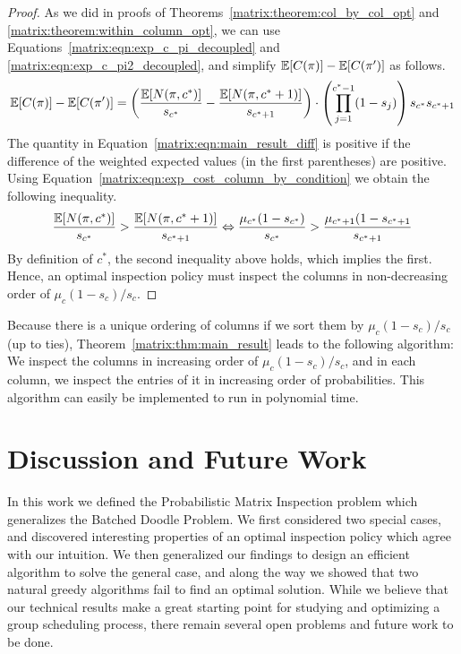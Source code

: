 \begin{proof}
 	As we did in proofs of Theorems~\ref{matrix:theorem:col_by_col_opt} and \ref{matrix:theorem:within_column_opt}, we can use Equations~\ref{matrix:eqn:exp_c_pi_decoupled} and \ref{matrix:eqn:exp_c_pi2_decoupled}, and simplify $\mathbb{E}[C(\pi)] - \mathbb{E}[C(\pi')]$ as follows.
	\small
 	\begin{equation} \label{matrix:eqn:main_result_diff}
 		\mathbb{E}[C(\pi)] - \mathbb{E}[C(\pi')] =  \left(\frac{\mathbb{E}[N(\pi, c^*)]}{s_{c^*}}  - \frac{\mathbb{E}[N(\pi, c^*+1)]}{s_{c^*+1}} \right)  \cdot \left( \prod_{j=1}^{c^*-1} (1 - s_j)\right) s_{c^*} s_{c^*+1}
 	\end{equation}	
	\normalsize
 	The quantity in Equation~\ref{matrix:eqn:main_result_diff} is positive if the difference of the weighted expected values (in the first parentheses) are positive. Using Equation~\ref{matrix:eqn:exp_cost_column_by_condition} we obtain the following inequality.
 	\begin{equation*}
 		\frac{\mathbb{E}[N(\pi, c^*)]}{s_{c^*}}  > \frac{\mathbb{E}[N(\pi, c^*+1)]}{s_{c^*+1}} 
 		\Leftrightarrow 
 		\frac{\mu_{c^*} (1 - s_{c^*})}{s_{c^*}} > \frac{\mu_{c^*+1}(1 - s_{c^*+1}}{s_{c^*+1}}
 	\end{equation*}
 	By definition of $c^*$, the second inequality above holds, which implies the first. Hence, an optimal inspection policy must inspect the columns in non-decreasing order of $\mu_c(1 - s_c)/s_c$. 
 \end{proof}
 Because there is a unique ordering of columns if we sort them by $\mu_c(1-s_c)/s_c$ (up to ties), Theorem~\ref{matrix:thm:main_result} leads to the following algorithm: We inspect the columns in increasing order of $\mu_c(1-s_c)/s_c$, and in each column, we inspect the entries of it in increasing order of probabilities. 
 This algorithm can easily be implemented to run in polynomial time. 


\section{Discussion and Future Work} \label{matrix:sec:discussion}
In this work we defined the Probabilistic Matrix Inspection problem which generalizes the Batched Doodle Problem.
We first considered two special cases, and discovered interesting properties of an optimal inspection policy which agree with our intuition. We then generalized our findings to design an efficient algorithm to solve the general case, and along the way we showed that two natural greedy algorithms fail to find an optimal solution. While we believe that our technical results make a great starting point for studying and optimizing a group scheduling process, there remain several open problems and future work to be done.

